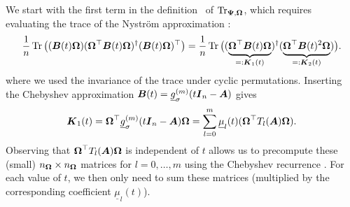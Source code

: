 We start with the first term in the definition~ of $\operatorname{Tr}_{\boldsymbol{\Psi}, \boldsymbol{\Omega}}$, which requires evaluating the trace of the 
Nyström approximation :
\begin{equation}
    \frac{1}{n} \operatorname{Tr} \big((\boldsymbol{B}(t) \boldsymbol{\Omega}) (\boldsymbol{\Omega}^{\top} \boldsymbol{B}(t) \boldsymbol{\Omega})^{\dagger} (\boldsymbol{B}(t) \boldsymbol{\Omega})^{\top} \big) =
    \frac{1}{n} \operatorname{Tr} \big((\underbrace{\boldsymbol{\Omega}^{\top} \boldsymbol{B}(t) \boldsymbol{\Omega}}_{=: \boldsymbol{K}_1(t)})^{\dagger} (\underbrace{\boldsymbol{\Omega}^{\top} \boldsymbol{B}(t)^2 \boldsymbol{\Omega}}_{=: \boldsymbol{K}_2(t)}) \big).
    \label{equ:cyclic-property}
\end{equation}
where we used the invariance of the trace under cyclic permutations.
Inserting the Chebyshev approximation  $\boldsymbol{B}(t) = \underline{g}_{\sigma}^{(m)}(t \boldsymbol{I}_n - \boldsymbol{A})$ gives
\begin{equation*}
    \boldsymbol{K}_1(t) = \boldsymbol{\Omega}^{\top} \underline{g}_{\sigma}^{(m)}(t \boldsymbol{I}_n - \boldsymbol{A}) \boldsymbol{\Omega} = \sum_{l=0}^{m} \underline{\mu}_l(t) (\boldsymbol{\Omega}^{\top} T_l(\boldsymbol{A}) \boldsymbol{\Omega}).
\end{equation*}
Observing that $\boldsymbol{\Omega}^{\top} T_l(\boldsymbol{A}) \boldsymbol{\Omega}$ is independent of $t$ allows us to precompute these (small) $n_{\boldsymbol{\Omega}} \times n_{\boldsymbol{\Omega}}$ matrices for $l=0, \dots, m$ using the Chebyshev recurrence . For each value of $t$, we then only need to sum these matrices (multiplied by the corresponding coefficient $\underline{\mu}_l(t)$).

